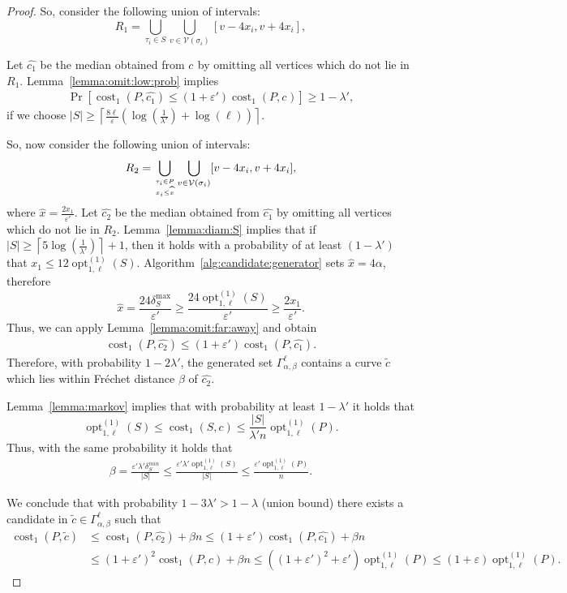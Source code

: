 \documentclass[11pt, letter]{article}
\DeclareMathOperator{\cost}{cost}
\DeclareMathOperator{\opt}{opt}
\newcommand{\lemref}[1]{Lemma~\ref{lemma:#1}}
\newcommand{\algref}[1]{Algorithm~\ref{alg:#1}}
\newcommand{\Frechet}{Fr\'echet\xspace}
\providecommand{\eps}{{\varepsilon}}\newcommand{\Astop}{\overline{a}}
\providecommand{\ceil}[1]{\left\lceil {#1} \right\rceil}
\newcommand{\lenClusters}{\ensuremath{\ell}}
\newcommand{\trajectory}[2]{\ensuremath{{#1}_{#2}}}
\newcommand{\inputSym}{\ensuremath{\tau}}
\newcommand{\centerSym}{\ensuremath{c}}
\newcommand{\inputTraj}[1]{\trajectory{\inputSym}{#1}}
\newcommand{\centerTraj}[1]{\trajectory{\centerSym}{#1}}
\newcommand{\VtxSet}{\ensuremath{\mathcal{V}}}
\begin{document}
\begin{proof}
So, consider the following union of intervals: 
\[ R_1 = \bigcup_{\inputTraj{i} \in S} \bigcup_{v \in \VtxSet(\sigma_i) } [v-4x_i,v+4x_i],\]

Let $\widehat{\centerTraj{1}}$ be the median obtained from $\centerTraj{}$ by
omitting all vertices which do not lie in $R_1$. 
\lemref{omit:low:prob} implies 
\begin{align*}
\Pr\left[ \cost_{1}(P,\widehat{\centerTraj{1}}) \leq (1+\eps')  \cost_{1}(P,\centerTraj{})\right]
\geq 1-\lambda',
\end{align*}
if we choose $|S| \geq \ceil{\frac{8\lenClusters}{\eps}
\left(\log\left(\frac{1}{\lambda'}\right)+\log(\lenClusters)\right)}$.

So, now consider the following union of intervals: 
\[ R_2 = \bigcup_{\inputTraj{i} \in P \atop x_i \leq \widehat{x}} \bigcup_{v \in \VtxSet(\sigma_i) } [v-4x_i,v+4x_i],\]
where $\widehat{x}=\frac{2 x_1}{\eps'}$.
Let $\widehat{\centerTraj{2}}$ be the median obtained from $\widehat{\centerTraj{1}}$ by
omitting all vertices which do not lie in $R_2$.
\lemref{diam:S} implies that if $|S| \geq \ceil{5\log(\frac{1}{\lambda'})}+1$, then
it holds with a probability of at least $(1-\lambda')$ that
$x_1 \leq  12 \opt^{{(1)}}_{1,\lenClusters}(S).$
\algref{candidate:generator} sets $\widehat{x} = 4\alpha$, therefore  
\[\widehat{x} = \frac{24 \delta_S^{\max}}{\eps'} \geq \frac{24
\opt^{(1)}_{1,\lenClusters}(S)}{\eps'}\geq \frac{2x_1}{\eps'}. \]
Thus, we can apply \lemref{omit:far:away} and obtain 
\begin{align*}
\cost_{1}(P,\widehat{\centerTraj{2}}) \leq (1+\eps')  \cost_{1}(P,\widehat{\centerTraj{1}}).
\end{align*}
Therefore, with probability $1-2\lambda'$, the generated set
$\Gamma^{\lenClusters}_{\alpha,\beta}$ contains a curve $\tilde{\centerTraj{}}$
which lies within \Frechet distance $\beta$ of $\widehat{\centerTraj{2}}$. 

\lemref{markov} implies that with probability at least $1-\lambda'$ it holds that 
\[\opt^{(1)}_{1,\lenClusters}(S) \leq \cost_{1}(S,c) \leq \frac{|S|}{\lambda' n}\opt^{(1)}_{1,\lenClusters}(P).\]
Thus, with the same probability it holds that
\begin{align*}
\beta = \frac{\eps'\lambda' \delta_S^{min}}{|S|} 
\leq \frac{\eps'\lambda' \opt^{(1)}_{1,\lenClusters}(S)}{|S|} 
\leq \frac{\eps' \opt^{(1)}_{1,\lenClusters}(P) }{n}.
\end{align*}

We conclude that with probability $1-3\lambda' > 1-\lambda$ (union bound)
there exists a candidate in $\tilde{c} \in \Gamma^{\lenClusters}_{\alpha,\beta}$ such that
\begin{align*}
\cost_{1}(P,\tilde{c}) &\leq \cost_{1}(P,\widehat{c_2}) + \beta n 
\leq (1+\eps')\cost_{1}(P,\widehat{c_1}) + \beta n\\
&\leq (1+\eps')^2 \cost_{1}(P,c) + \beta n
\leq ((1+\eps')^2 + \eps') \opt^{(1)}_{1,\lenClusters}(P) 
\leq (1+\eps) \opt^{(1)}_{1,\lenClusters}(P). 
\end{align*}


\end{proof}
\end{document}
